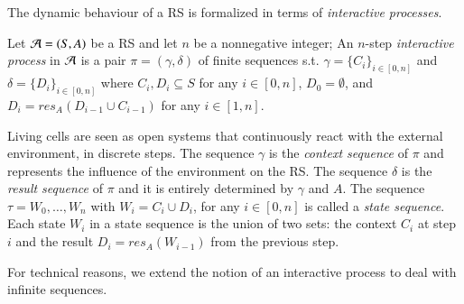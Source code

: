 The dynamic behaviour of a RS is formalized in terms of 
{\em interactive processes}.


\begin{definition}
Let ${\cal A} = (S, A)$ be a RS and let $n$
be a nonnegative integer;   
An $n$-step
\emph{interactive process} in ${\cal A}$ is a pair $\pi = (\gamma, \delta)$ of 
finite sequences s.t.
%
$ \gamma=\{C_i\}_{i\in[0,n]}$  and $\delta=\{D_i\}_{i\in[0,n]} $
where 
$ C_{i}, D_{i}  \subseteq S$ for any $i\in[0,n]$, $D_0 = \emptyset$, and 
$D_i =  \mathit{res}_{A}(D_{i-1} \cup C_{i-1})$ for any $i \in [1,n]$.
\end{definition}

Living cells are seen as open systems that continuously react with 
the external environment, in discrete steps. 
The sequence $\gamma$ is the {\em context sequence} of $\pi$ and 
represents the influence of the environment on the 
RS.
The sequence $\delta$ is
the {\em result sequence} of $\pi$ and it is entirely determined by $\gamma$ and $A$.
%
The sequence $\tau = W_{0}, \ldots, W_{n}$ with $W_{i} = C_{i} \cup D_{i}$, 
for any $i \in [0, n]$
is called a \emph{state sequence}.
%
Each state $W_{i}$ in a state sequence
is the union of two sets: the context $C_{i}$
at step $i$ and the result $D_i=\mathit{res}_{A}(W_{i-1})$ from the previous step.

%
%


For technical reasons, we extend the notion of an interactive process to deal with 
infinite sequences.

